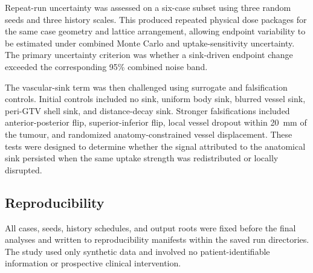 Repeat-run uncertainty was assessed on a six-case subset using three random seeds and three history scales. This produced repeated physical dose packages for the same case geometry and lattice arrangement, allowing endpoint variability to be estimated under combined Monte Carlo and uptake-sensitivity uncertainty. The primary uncertainty criterion was whether a sink-driven endpoint change exceeded the corresponding 95\% combined noise band.

The vascular-sink term was then challenged using surrogate and falsification controls. Initial controls included no sink, uniform body sink, blurred vessel sink, peri-GTV shell sink, and distance-decay sink. Stronger falsifications included anterior-posterior flip, superior-inferior flip, local vessel dropout within 20~mm of the tumour, and randomized anatomy-constrained vessel displacement. These tests were designed to determine whether the signal attributed to the anatomical sink persisted when the same uptake strength was redistributed or locally disrupted.

\subsection{Reproducibility}

All cases, seeds, history schedules, and output roots were fixed before the final analyses and written to reproducibility manifests within the saved run directories. The study used only synthetic data and involved no patient-identifiable information or prospective clinical intervention.
